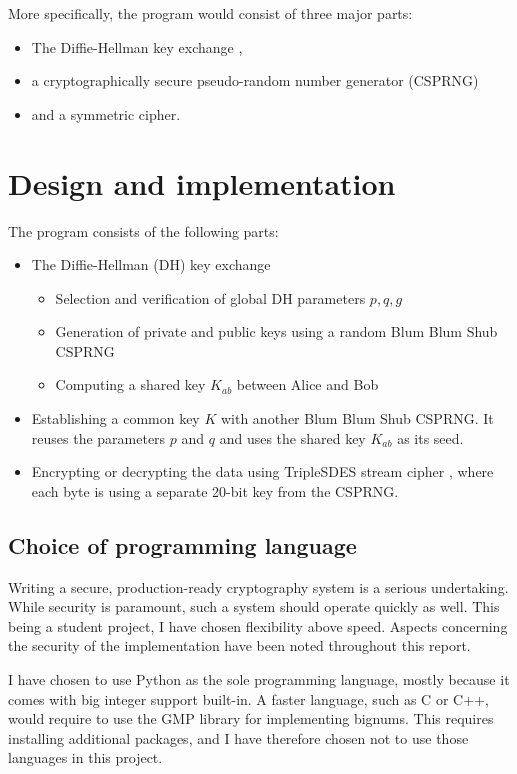 \documentclass[a4paper,english,12pt]{article}
\begin{document}
More specifically, the program would consist of three major parts:
\begin{itemize}
  \item The Diffie-Hellman key exchange \cite{dh},
  \item a cryptographically secure pseudo-random number generator (CSPRNG)
  \item and a symmetric cipher.
\end{itemize}

\section{Design and implementation}
The program consists of the following parts:
\begin{itemize}
  \item The Diffie-Hellman \cite{dh} (DH) key exchange
    \begin{itemize}
      \item Selection and verification of global DH parameters $p, q, g$
      \item Generation of private and public keys using a random Blum Blum Shub CSPRNG
      \item Computing a shared key $K_{ab}$ between Alice and Bob
    \end{itemize}
  \item Establishing a common key $K$ with another Blum Blum Shub CSPRNG. It
    reuses the parameters $p$ and $q$ and uses the shared key $K_{ab}$ as its
    seed.
  \item Encrypting or decrypting the data using TripleSDES stream cipher
    \cite{sdes}, where each byte is using a separate 20-bit key from the
    CSPRNG.
\end{itemize}

\subsection{Choice of programming language}
Writing a secure, production-ready cryptography system is a serious
undertaking. While security is paramount, such a system should operate quickly
as well. This being a student project, I have chosen flexibility above
speed. Aspects concerning the security of the implementation have been noted
throughout this report.

I have chosen to use Python as the sole programming language, mostly because it
comes with big integer support built-in. A faster language, such as C or C++,
would require to use the GMP library \cite{wiki:gmp} for implementing bignums.
This requires installing additional packages, and I have therefore chosen not
to use those languages in this project.
\end{document}
